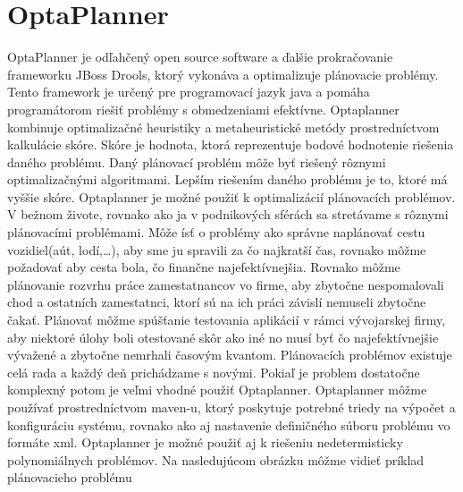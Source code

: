 \chapter{OptaPlanner}\label{optaplannerC}
OptaPlanner je odľahčený open source software a ďalšie prokračovanie frameworku JBoss Drools, ktorý vykonáva a optimalizuje plánovacie problémy. Tento framework je určený pre programovací jazyk java a pomáha programátorom riešiť problémy s obmedzeniami efektívne. Optaplanner kombinuje optimalizačné heuristiky a metaheuristické metódy prostredníctvom kalkulácie skóre. Skóre je hodnota, ktorá reprezentuje bodové hodnotenie riešenia daného problému. Daný plánovací problém môže byť riešený rôznymi optimalizačnými algoritmami. Lepším riešením daného problému je to, ktoré má vyššie skóre. Optaplanner je možné použiť k optimalizácií plánovacích problémov. V bežnom živote, rovnako ako ja v podnikových sférách sa stretávame s rôznymi plánovacími problémami. Môže ísť o problémy ako správne naplánovať cestu vozidiel(aút, lodí,\ldots), aby sme ju spravili za čo najkratší čas, rovnako môžme požadovať aby cesta bola, čo finančne najefektívnejšia. Rovnako môžme plánovanie rozvrhu práce zamestatnancov vo firme, aby zbytočne nespomalovali chod a ostatních zamestatnci, ktorí sú na ich práci závislí nemuseli zbytočne čakať. Plánovať môžme spúšťanie testovania aplikácií v rámci vývojarskej firmy, aby niektoré úlohy boli otestované skôr ako iné no musí byť čo najefektívnejšie vývažené a zbytočne nemrhali časovým kvantom. Plánovacích problémov existuje celá rada a každý deň prichádzame s novými. Pokiaľ je problem dostatočne komplexný potom je veľmi vhodné použiť Optaplanner. Optaplanner môžme používať prostredníctvom maven-u, ktorý poskytuje potrebné triedy na výpočet a konfiguráciu systému, rovnako ako aj nastavenie definičného súboru problému vo formáte xml. Optaplanner je možné použiť aj k riešeniu nedetermisticky polynomiálnych problémov. Na nasledujúcom obrázku môžme vidieť príklad plánovacieho problému

